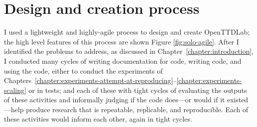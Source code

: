 \documentclass[logo,msc,dsti]{style/infthesis}    %
\begin{document}
{\section{Design and creation process}

I used a lightweight and highly-agile process to design and create OpenTTDLab; the high level features of this process are shown Figure \ref{fig:solo-agile}. After I identified the problems to address, as discussed in Chapter~\ref{chapter:introduction}, I conducted many cycles of writing documentation for code, writing code, and using the code, either to conduct the experiments of Chapters~\ref{chapter:experiments-attempt-at-reproducing}--\ref{chapter:experiments-scaling} or in tests; and each of these with tight cycles of evaluating the outputs of these activities and informally judging if the code does---or would if it existed---help produce research that is repeatable, replicable, and reproducible. Each of these activities would inform each other, again in tight cycles.
%
\begin{figure}[ht]
\centering
{}
\end{figure}}
\end{document}
